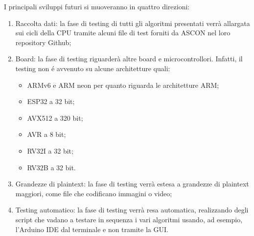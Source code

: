 I principali sviluppi futuri si muoveranno in quattro direzioni: \begin{enumerate}
    \item Raccolta dati: la fase di testing di tutti gli algoritmi presentati verrà allargata sui cicli della CPU tramite alcuni file di test forniti da ASCON nel loro repository Github\cite{github};
    \item Board: la fase di testing riguarderà altre board e microcontrollori. Infatti, il testing non é avvenuto su alcune architetture quali:
    \begin{itemize}
        \item ARMv6 e ARM neon per quanto riguarda le architetture ARM;
        \item ESP32 a 32 bit;
        \item AVX512 a 320 bit;
        \item AVR a 8 bit;
        \item RV32I a 32 bit;
        \item RV32B a 32 bit.
    \end{itemize}
    \item Grandezze di plaintext: la fase di testing verrà estesa a grandezze di plaintext maggiori, come file che codificano immagini o video;
    \item Testing automatico: la fase di testing verrà resa automatica, realizzando degli script che vadano a testare in sequenza i vari algoritmi usando, ad esempio, l'Arduino IDE dal terminale e non tramite la GUI.
\end{enumerate}
